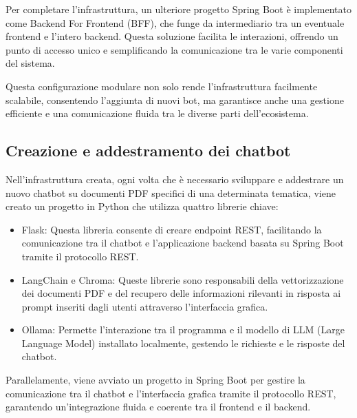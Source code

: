 \documentclass[a4paper,twoside,12pt]{toptesi}
\begin{document}
Per completare l'infrastruttura, un ulteriore progetto Spring Boot è implementato come Backend For Frontend (BFF), che funge da intermediario tra un eventuale frontend e l'intero backend. Questa soluzione facilita le interazioni, offrendo un punto di accesso unico e semplificando la comunicazione tra le varie componenti del sistema.

Questa configurazione modulare non solo rende l'infrastruttura facilmente scalabile, consentendo l'aggiunta di nuovi bot, ma garantisce anche una gestione efficiente e una comunicazione fluida tra le diverse parti dell'ecosistema.

\subsection{Creazione e addestramento dei chatbot}

Nell'infrastruttura creata, ogni volta che è necessario sviluppare e addestrare un nuovo chatbot su documenti PDF specifici di una determinata tematica, viene creato un progetto in Python che utilizza quattro librerie chiave:

\begin{itemize}
	\item Flask: Questa libreria consente di creare endpoint REST, facilitando la comunicazione tra il chatbot e l'applicazione backend basata su Spring Boot tramite il protocollo REST.
	\item LangChain e Chroma: Queste librerie sono responsabili della vettorizzazione dei documenti PDF e del recupero delle informazioni rilevanti in risposta ai prompt inseriti dagli utenti attraverso l'interfaccia grafica.
	\item Ollama: Permette l'interazione tra il programma e il modello di LLM (Large Language Model) installato localmente, gestendo le richieste e le risposte del chatbot.
\end{itemize}

Parallelamente, viene avviato un progetto in Spring Boot per gestire la comunicazione tra il chatbot e l'interfaccia grafica tramite il protocollo REST, garantendo un'integrazione fluida e coerente tra il frontend e il backend.
\end{document}
